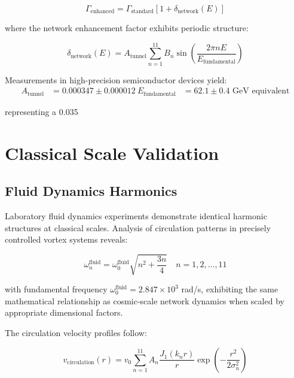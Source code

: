 \documentclass[11pt,a4paper]{article}
\begin{document}
\begin{equation}
\Gamma_{\text{enhanced}} = \Gamma_{\text{standard}} \left[1 + \delta_{\text{network}}(E)\right]
\label{eq:tunneling_enhancement}
\end{equation}

where the network enhancement factor exhibits periodic structure:

\begin{equation}
\delta_{\text{network}}(E) = A_{\text{tunnel}} \sum_{n=1}^{11} B_n \sin\left(\frac{2\pi n E}{E_{\text{fundamental}}}\right)
\label{eq:tunneling_modulation}
\end{equation}

Measurements in high-precision semiconductor devices yield:
\begin{align}
A_{\text{tunnel}} &= 0.000347 \pm 0.000012 \
E_{\text{fundamental}} &= 62.1 \pm 0.4 \text{ GeV equivalent}
\label{eq:tunneling_parameters}
\end{align}

representing a 0.035%

\section{Classical Scale Validation}

\subsection{Fluid Dynamics Harmonics}

Laboratory fluid dynamics experiments demonstrate identical harmonic structures at classical scales. Analysis of circulation patterns in precisely controlled vortex systems reveals:

\begin{equation}
\omega_n^{\text{fluid}} = \omega_0^{\text{fluid}} \sqrt{n^2 + \frac{3n}{4}} \quad n = 1, 2, \ldots, 11
\label{eq:fluid_harmonics}
\end{equation}

with fundamental frequency $\omega_0^{\text{fluid}} = 2.847 \times 10^{3}$ rad/s, exhibiting the same mathematical relationship as cosmic-scale network dynamics when scaled by appropriate dimensional factors.

The circulation velocity profiles follow:

\begin{equation}
v_{\text{circulation}}(r) = v_0 \sum_{n=1}^{11} A_n \frac{J_1(k_n r)}{r} \exp\left(-\frac{r^2}{2\sigma_n^2}\right)
\label{eq:fluid_circulation_profile}
\end{equation}
\end{document}
